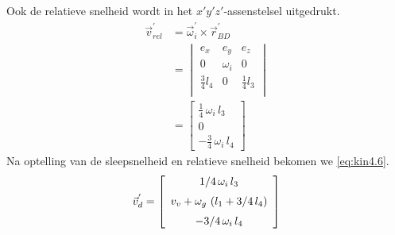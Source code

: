 Ook de relatieve snelheid wordt in het $x'y'z'$-assenstelsel uitgedrukt.
\begin{equation}
\begin{split}
\vec{v}_{rel}^{'}&=\vec{\omega}_{i}^{'}\times\vec{r}_{BD}^{'}\\
&=\begin{vmatrix}
e_{x}&e_{y}&e_{z}\\
0&\omega_{i}&0\\
\frac{3}{4}l_{4}&0&\frac{1}{4}l_{3}\\
\end{vmatrix}\\
&=\left[\begin{array}{c}\frac{1}{4}\,\omega_{i}\,l_{3}\\0\\-\frac{3}{4}\,\omega_{i}\,l_{4}\end{array}\right]
\end{split}
\label{eq:kin4.5}
\end{equation}
Na optelling van de sleepsnelheid en relatieve snelheid bekomen we \eqref{eq:kin4.6}.
\begin{equation}
\vec{v}_{d}^{'}=\left[ \begin {array}{c} 1/4\,\omega_{i}\,l_{3}\\ \noalign{\medskip}v_{v}+\omega_{g}\, \left( l_{1}+3/4\,l_{4} \right) \\ \noalign{\medskip}-3/4\,\omega_{i}\,l_{4}\end {array} \right]
\label{eq:kin4.6}
\end{equation}
